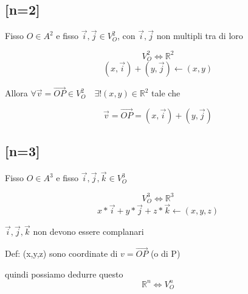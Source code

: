 \documentclass{article}
\begin{document}
\subsection*{[n=2]}
\begin{flushleft}
	Fisso $O \in A^2$ e fisso $\overrightarrow{i},\overrightarrow{j} \in V^2_O$, con $\overrightarrow{i},\overrightarrow{j}$ non multipli tra di loro
\end{flushleft}
\begin{equation*}
	V_O^2 \iff \mathbb{R}^2
\end{equation*}
\begin{equation*}
	(x,\overrightarrow{i})+(y,\overrightarrow{j}) \leftarrow (x,y)
\end{equation*}
\begin{flushleft}
	Allora $\forall \overrightarrow{v}=\overrightarrow{OP} \in V^2_O \quad \exists ! (x,y) \in \mathbb{R}^2$ tale che
\end{flushleft}
\begin{equation*}
	\overrightarrow{v}=\overrightarrow{OP}=(x,\overrightarrow{i})+(y,\overrightarrow{j})
\end{equation*}
\subsection*{[n=3]}
\begin{flushleft}
	Fisso $O \in A^3$ e fisso $\overrightarrow{i},\overrightarrow{j},\overrightarrow{k} \in V^3_O$
\end{flushleft}
\begin{equation*}
	V_O^3 \iff \mathbb{R}^3
\end{equation*}
\begin{equation*}
	x*\overrightarrow{i}+y*\overrightarrow{j}+z*\overrightarrow{k} \leftarrow (x,y,z)
\end{equation*}
\begin{flushleft}
	$\overrightarrow{i},\overrightarrow{j},\overrightarrow{k}$ non devono essere complanari
\end{flushleft}
\begin{flushleft}
	Def: (x,y,z) sono coordinate di $v=\overrightarrow{OP}$ (o di P)
\end{flushleft}
quindi possiamo dedurre questo
\begin{equation*}
	\mathbb{R}^n \iff V_O^n
\end{equation*}
\end{document}
